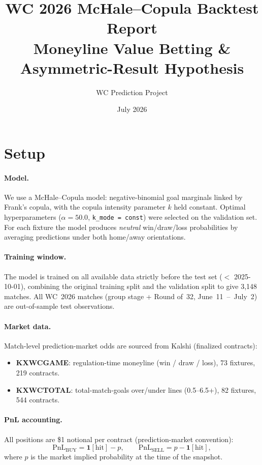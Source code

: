 \documentclass[11pt, a4paper]{article}
\title{\textbf{WC 2026 McHale--Copula Backtest Report}\\[0.4em]
       \large Moneyline Value Betting \& Asymmetric-Result Hypothesis}
\author{WC Prediction Project}
\date{July 2026}
\begin{document}
\maketitle

\section{Setup}

\paragraph{Model.}
We use a McHale--Copula model: negative-binomial goal marginals linked by
Frank's copula, with the copula intensity parameter $k$ held constant.
Optimal hyperparameters ($\alpha = 50.0$, \texttt{k\_mode = const}) were
selected on the validation set.
For each fixture the model produces \emph{neutral} win/draw/loss
probabilities by averaging predictions under both home/away orientations.

\paragraph{Training window.}
The model is trained on all available data strictly before the test set
($<$ 2025-10-01), combining the original training split and the validation
split to give 3{,}148 matches.
All WC~2026 matches (group stage + Round of~32, June~11~--~July~2) are
out-of-sample test observations.

\paragraph{Market data.}
Match-level prediction-market odds are sourced from Kalshi (finalized
contracts):
\begin{itemize}
  \item \textbf{KXWCGAME}: regulation-time moneyline (win / draw / loss),
        73 fixtures, 219 contracts.
  \item \textbf{KXWCTOTAL}: total-match-goals over/under lines
        (0.5--6.5+), 82 fixtures, 544 contracts.
\end{itemize}

\paragraph{PnL accounting.}
All positions are \$1 notional per contract (prediction-market convention):
\[
  \text{PnL}_{\text{BUY}}  = \mathbf{1}[\text{hit}] - p, \qquad
  \text{PnL}_{\text{SELL}} = p - \mathbf{1}[\text{hit}],
\]
where $p$ is the market implied probability at the time of the snapshot.
\end{document}
